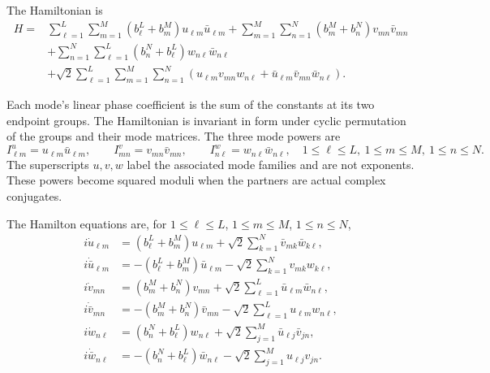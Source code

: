 \begin{samepage}
The Hamiltonian is
\begin{align}\label{eq:canonical-H}
H={}&\sum_{\ell=1}^{L}\sum_{m=1}^{M}
 (b_\ell^{L}+b_m^{M})u_{\ell m}\bar{u}_{\ell m}
 +\sum_{m=1}^{M}\sum_{n=1}^{N}
 (b_m^{M}+b_n^{N})v_{mn}\bar{v}_{mn}\nonumber\\
&+\sum_{n=1}^{N}\sum_{\ell=1}^{L}
 (b_n^{N}+b_\ell^{L})w_{n\ell}\bar{w}_{n\ell}\nonumber\\
&+\sqrt2\sum_{\ell=1}^{L}\sum_{m=1}^{M}\sum_{n=1}^{N}
 \left(u_{\ell m}v_{mn}w_{n\ell}
       +\bar{u}_{\ell m}\bar{v}_{mn}\bar{w}_{n\ell}\right).
\end{align}
\end{samepage}
Each mode's linear phase coefficient is the sum of the constants at its two
endpoint groups. The Hamiltonian is invariant in form under cyclic
permutation of the groups and their mode matrices.
The three mode powers are
\begin{equation}\label{eq:canonical-powers}
 I^u_{\ell m}=u_{\ell m}\bar{u}_{\ell m},\qquad
 I^v_{mn}=v_{mn}\bar{v}_{mn},\qquad
 I^w_{n\ell}=w_{n\ell}\bar{w}_{n\ell},
 \quad1\leq\ell\leq L,\ 1\leq m\leq M,\ 1\leq n\leq N.
\end{equation}
The superscripts $u,v,w$ label the associated mode families and are
not exponents. These powers become squared moduli when the partners are actual complex
conjugates.

The Hamilton equations are, for
$1\leq\ell\leq L$, $1\leq m\leq M$, $1\leq n\leq N$,
\begin{equation}\label{eq:canonical-rates}
\begin{aligned}
 i\dot u_{\ell m}&=(b_\ell^L+b_m^M)u_{\ell m}
            +\sqrt2\sum_{k=1}^{N}\bar{v}_{mk}\bar{w}_{k\ell},\\
 i\dot{\bar{u}}_{\ell m}&=-(b_\ell^L+b_m^M)\bar{u}_{\ell m}
            -\sqrt2\sum_{k=1}^{N}v_{mk}w_{k\ell},\\
 i\dot v_{mn}&=(b_m^{M}+b_n^N)v_{mn}
       +\sqrt2\sum_{\ell=1}^{L}\bar{u}_{\ell m}\bar{w}_{n\ell},\\
 i\dot{\bar{v}}_{mn}&=-(b_m^{M}+b_n^N)\bar{v}_{mn}
       -\sqrt2\sum_{\ell=1}^{L}u_{\ell m}w_{n\ell},\\
 i\dot w_{n\ell}&=(b_n^N+b_\ell^{L})w_{n\ell}
       +\sqrt2\sum_{j=1}^{M}\bar{u}_{\ell j}\bar{v}_{jn},\\
 i\dot{\bar{w}}_{n\ell}&=-(b_n^N+b_\ell^{L})\bar{w}_{n\ell}
       -\sqrt2\sum_{j=1}^{M}u_{\ell j}v_{jn}.
\end{aligned}
\end{equation}

